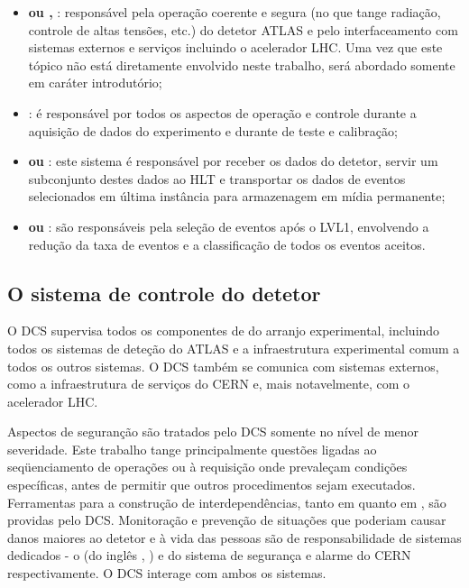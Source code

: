 \begin{itemize}
\item \textbf{ ou , }: responsável pela operação coerente e segura (no que tange
radiação, controle de altas tensões, etc.) do detetor ATLAS e pelo
interfaceamento com sistemas externos e serviços incluindo o acelerador
LHC. Uma vez que este tópico não está diretamente envolvido neste trabalho,
será abordado somente em caráter introdutório;

\item \textbf{}: é responsável por todos os aspectos de
operação e controle durante a aquisição de dados do experimento e durante
 de teste e calibração;

\item \textbf{ ou }: este sistema é
responsável por receber os dados do detetor, servir um subconjunto destes
dados ao HLT e transportar os dados de eventos selecionados em última
instância para armazenagem em mídia permanente;

\item \textbf{ ou }: são responsáveis pela
seleção de eventos após o LVL1, envolvendo a redução da taxa de eventos e a
classificação de todos os eventos aceitos.

\end{itemize}

\subsection{O sistema de controle do detetor}
\label{sec:dcs}

O DCS supervisa todos os componentes de  do arranjo
experimental, incluindo todos os sistemas de deteção do ATLAS e a
infraestrutura experimental comum a todos os outros sistemas. O DCS também se
comunica com sistemas externos, como a infraestrutura de serviços do CERN e,
mais notavelmente, com o acelerador LHC.

Aspectos de seguranção são tratados pelo DCS somente no nível de menor
severidade. Este trabalho tange principalmente questões ligadas ao
seqüenciamento de operações ou à requisição onde prevaleçam condições
específicas, antes de permitir que outros procedimentos sejam
executados. Ferramentas para a construção de interdependências, tanto em
 quanto em , são providas pelo DCS. Monitoração e
prevenção de situações que poderiam causar danos maiores ao detetor e à vida
das pessoas são de responsabilidade de sistemas dedicados - o  (do inglês , ) e
do sistema de segurança e alarme do CERN respectivamente. O DCS interage com
ambos os sistemas.

